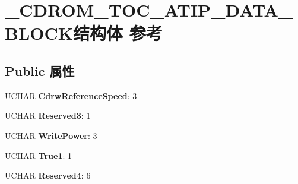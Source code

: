 \hypertarget{struct___c_d_r_o_m___t_o_c___a_t_i_p___d_a_t_a___b_l_o_c_k}{}\section{\+\_\+\+C\+D\+R\+O\+M\+\_\+\+T\+O\+C\+\_\+\+A\+T\+I\+P\+\_\+\+D\+A\+T\+A\+\_\+\+B\+L\+O\+C\+K结构体 参考}
\label{struct___c_d_r_o_m___t_o_c___a_t_i_p___d_a_t_a___b_l_o_c_k}
\subsection*{Public 属性}
\begin{DoxyCompactItemize}
\item 
\mbox{\label{struct___c_d_r_o_m___t_o_c___a_t_i_p___d_a_t_a___b_l_o_c_k_ace0bf53665168e409d8dec66424a430c}} 
U\+C\+H\+AR {\bfseries Cdrw\+Reference\+Speed}\+: 3
\item 
\mbox{\label{struct___c_d_r_o_m___t_o_c___a_t_i_p___d_a_t_a___b_l_o_c_k_a08b58a226ea316ed2a76011b53dfc55c}} 
U\+C\+H\+AR {\bfseries Reserved3}\+: 1
\item 
\mbox{\label{struct___c_d_r_o_m___t_o_c___a_t_i_p___d_a_t_a___b_l_o_c_k_abc8d8a99476860668c0db30552e213de}} 
U\+C\+H\+AR {\bfseries Write\+Power}\+: 3
\item 
\mbox{\label{struct___c_d_r_o_m___t_o_c___a_t_i_p___d_a_t_a___b_l_o_c_k_a836371d3866360d2af8d7de25ca6f4df}} 
U\+C\+H\+AR {\bfseries True1}\+: 1
\item 
\mbox{\label{struct___c_d_r_o_m___t_o_c___a_t_i_p___d_a_t_a___b_l_o_c_k_a8e9db28b489d304ae365628f9ba55423}} 
U\+C\+H\+AR {\bfseries Reserved4}\+: 6
\item 
\mbox{\label{struct___c_d_r_o_m___t_o_c___a_t_i_p___d_a_t_a___b_l_o_c_k_a4de075947014a46b622eb5a3206edfa6}} 

\end{DoxyCompactItemize}
